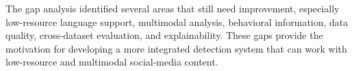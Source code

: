 The gap analysis identified several areas that still need improvement, especially
low-resource language support, multimodal analysis, behavioral information, data
quality, cross-dataset evaluation, and explainability. These gaps provide the
motivation for developing a more integrated detection system that can work with
low-resource and multimodal social-media content.